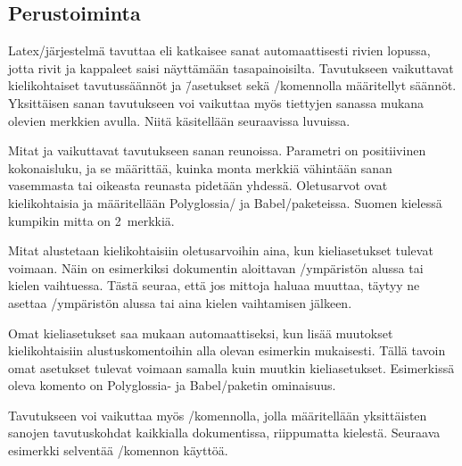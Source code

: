 \subsection{Perustoiminta}

Latex\-/järjestelmä tavuttaa eli katkaisee sanat automaattisesti rivien
lopussa, jotta rivit ja kappaleet saisi näyttämään tasapainoisilta.
Tavutukseen vaikuttavat kielikohtaiset tavutussäännöt ja \=/asetukset
sekä \-/komennolla määritellyt säännöt.
Yksittäisen sanan tavutukseen voi vaikuttaa myös tiettyjen sanassa
mukana olevien merkkien avulla. Niitä käsitellään seuraavissa luvuissa.

Mitat  ja 
vaikuttavat tavutukseen sanan reunoissa. Parametri  on
positiivinen kokonaisluku, ja se määrittää, kuinka monta merkkiä
vähintään sanan vasemmasta tai oikeasta reunasta pidetään yhdessä.
Oletus\-arvot ovat kielikohtaisia ja määritellään Polyglossia\-/{} ja
Babel\-/paketeissa. Suomen kielessä kumpikin mitta on 2~merkkiä.

Mitat alustetaan kielikohtaisiin oletus\-arvoihin aina, kun
kie\-li\-ase\-tuk\-set tulevat voimaan. Näin on esimerkiksi dokumentin
aloittavan \-/ympäristön alussa tai kielen vaihtuessa.
Tästä seuraa, että jos mittoja ha\-luaa muuttaa, täytyy ne asettaa
\-/ympäristön alussa tai aina kielen vaihtamisen
jälkeen.

Omat kieli\-asetukset saa mukaan automaattiseksi, kun lisää muutokset
kielikohtaisiin alustuskomentoihin alla olevan esimerkin mukaisesti.
Tällä tavoin omat asetukset tulevat voimaan samalla kuin muutkin
kieli\-asetukset. Esimerkissä oleva komento  on
Polyglossia- ja Babel\-/paketin ominaisuus.

\begin{koodilohkosis}
\end{koodilohkosis}

Tavutukseen voi vaikuttaa myös \-/komennolla,
jolla määritellään yksittäisten sanojen tavutuskohdat kaikkialla
dokumentissa, riippumatta kielestä. Seuraava esimerkki selventää
\-/komennon käyttöä.

\begin{koodilohkosis}
\end{koodilohkosis}

